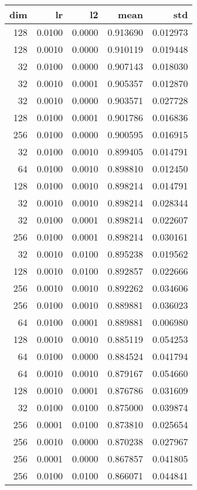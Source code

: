 \begin{tabular}{rrrrr}
\toprule
 dim &      lr &      l2 &      mean &       std \\
\midrule
 128 &  0.0100 &  0.0000 &  0.913690 &  0.012973 \\
 128 &  0.0010 &  0.0000 &  0.910119 &  0.019448 \\
  32 &  0.0100 &  0.0000 &  0.907143 &  0.018030 \\
  32 &  0.0010 &  0.0001 &  0.905357 &  0.012870 \\
  32 &  0.0010 &  0.0000 &  0.903571 &  0.027728 \\
 128 &  0.0100 &  0.0001 &  0.901786 &  0.016836 \\
 256 &  0.0100 &  0.0000 &  0.900595 &  0.016915 \\
  32 &  0.0100 &  0.0010 &  0.899405 &  0.014791 \\
  64 &  0.0100 &  0.0010 &  0.898810 &  0.012450 \\
 128 &  0.0100 &  0.0010 &  0.898214 &  0.014791 \\
  32 &  0.0010 &  0.0010 &  0.898214 &  0.028344 \\
  32 &  0.0100 &  0.0001 &  0.898214 &  0.022607 \\
 256 &  0.0100 &  0.0001 &  0.898214 &  0.030161 \\
  32 &  0.0010 &  0.0100 &  0.895238 &  0.019562 \\
 128 &  0.0010 &  0.0100 &  0.892857 &  0.022666 \\
 256 &  0.0010 &  0.0010 &  0.892262 &  0.034606 \\
 256 &  0.0100 &  0.0010 &  0.889881 &  0.036023 \\
  64 &  0.0100 &  0.0001 &  0.889881 &  0.006980 \\
 128 &  0.0010 &  0.0010 &  0.885119 &  0.054253 \\
  64 &  0.0100 &  0.0000 &  0.884524 &  0.041794 \\
  64 &  0.0010 &  0.0010 &  0.879167 &  0.054660 \\
 128 &  0.0010 &  0.0001 &  0.876786 &  0.031609 \\
  32 &  0.0100 &  0.0100 &  0.875000 &  0.039874 \\
 256 &  0.0001 &  0.0100 &  0.873810 &  0.025654 \\
 256 &  0.0010 &  0.0000 &  0.870238 &  0.027967 \\
 256 &  0.0001 &  0.0000 &  0.867857 &  0.041805 \\
 256 &  0.0100 &  0.0100 &  0.866071 &  0.044841 \\

\end{tabular}
